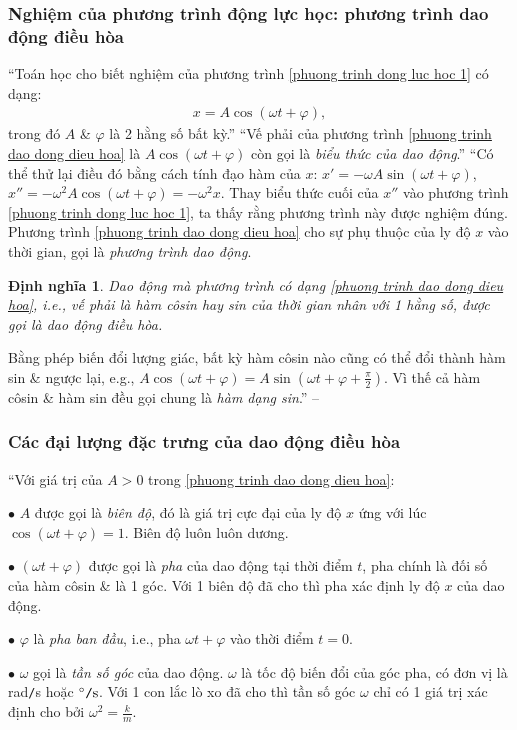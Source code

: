 \documentclass{article}
\numberwithin{equation}{section}
\newtheorem{dinhnghia}{Định nghĩa}[section]
\begin{document}
\subsubsection{Nghiệm của phương trình động lực học: phương trình dao động điều hòa}
``Toán học cho biết nghiệm của phương trình \eqref{phuong trinh dong luc hoc 1} có dạng:
\begin{align}
	\label{phuong trinh dao dong dieu hoa}
	x = A\cos(\omega t + \varphi),
\end{align}
trong đó $A$ \& $\varphi$ là 2 hằng số bất kỳ.'' ``Vế phải của phương trình \eqref{phuong trinh dao dong dieu hoa} là $A\cos(\omega t + \varphi)$ còn gọi là \textit{biểu thức của dao động}.'' ``Có thể thử lại điều đó bằng cách tính đạo hàm của $x$: $x' = -\omega A\sin(\omega t + \varphi)$, $x'' = -\omega^2A\cos(\omega t + \varphi) = -\omega^2x$. Thay biểu thức cuối của $x''$ vào phương trình \eqref{phuong trinh dong luc hoc 1}, ta thấy rằng phương trình này được nghiệm đúng. Phương trình \eqref{phuong trinh dao dong dieu hoa} cho sự phụ thuộc của ly độ $x$ vào thời gian, gọi là \textit{phương trình dao động}.

\begin{dinhnghia}
	Dao động mà phương trình có dạng \eqref{phuong trinh dao dong dieu hoa}, i.e., vế phải là hàm côsin hay sin của thời gian nhân với 1 hằng số, được gọi là \emph{dao động điều hòa}.
\end{dinhnghia}
Bằng phép biến đổi lượng giác, bất kỳ hàm côsin nào cũng có thể đổi thành hàm sin \& ngược lại, e.g., $A\cos(\omega t + \varphi) = A\sin\left(\omega t + \varphi + \frac{\pi}{2}\right)$. Vì thế cả hàm côsin \& hàm sin đều gọi chung là \textit{hàm dạng sin}.'' -- \cite[pp. 30--31]{SGK_Vat_Ly_12_nang_cao}

\subsubsection{Các đại lượng đặc trưng của dao động điều hòa}
``Với giá trị của $A > 0$ trong \eqref{phuong trinh dao dong dieu hoa}:
\begin{enumerate*}
	\item[$\bullet$] $A$ được gọi là \textit{biên độ}, đó là giá trị cực đại của ly độ $x$ ứng với lúc $\cos(\omega t + \varphi) = 1$. Biên độ luôn luôn dương.
	\item[$\bullet$] $(\omega t + \varphi)$ được gọi là \textit{pha} của dao động tại thời điểm $t$, pha chính là đối số của hàm côsin \& là 1 góc. Với 1 biên độ đã cho thì pha xác định ly độ $x$ của dao động.
	\item[$\bullet$] $\varphi$ là \textit{pha ban đầu}, i.e., pha $\omega t + \varphi$ vào thời điểm $t = 0$.
	\item[$\bullet$] $\omega$ gọi là \textit{tần số góc} của dao động. $\omega$ là tốc độ biến đổi của góc pha, có đơn vị là rad\texttt{/}s hoặc $\rm{}^\circ\texttt{/}s$. Với 1 con lắc lò xo đã cho thì tần số góc $\omega$ chỉ có 1 giá trị xác định cho bởi $\omega^2 = \frac{k}{m}$.
\end{enumerate*}
\end{document}
